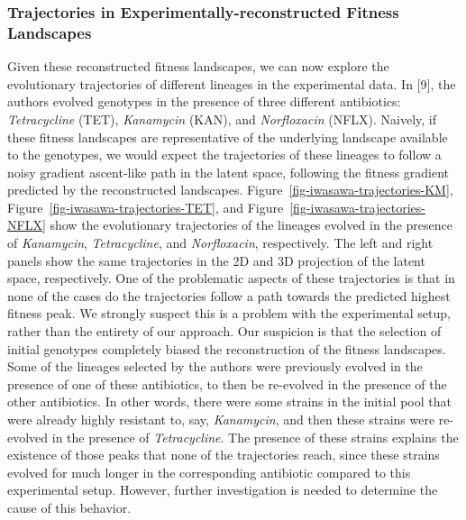 \documentclass[
]{scrartcl}
\begin{document}
\begin{refsection}
\begin{figure}
\end{figure}%

\subsubsection{Trajectories in Experimentally-reconstructed Fitness
Landscapes}\label{trajectories-in-experimentally-reconstructed-fitness-landscapes}

Given these reconstructed fitness landscapes, we can now explore the
evolutionary trajectories of different lineages in the experimental
data. In {[}9{]}, the authors evolved genotypes in the presence of three
different antibiotics: \emph{Tetracycline} (TET), \emph{Kanamycin}
(KAN), and \emph{Norfloxacin} (NFLX). Naively, if these fitness
landscapes are representative of the underlying landscape available to
the genotypes, we would expect the trajectories of these lineages to
follow a noisy gradient ascent-like path in the latent space, following
the fitness gradient predicted by the reconstructed landscapes.
Figure~\ref{fig-iwasawa-trajectories-KM},
Figure~\ref{fig-iwasawa-trajectories-TET}, and
Figure~\ref{fig-iwasawa-trajectories-NFLX} show the evolutionary
trajectories of the lineages evolved in the presence of
\emph{Kanamycin}, \emph{Tetracycline}, and \emph{Norfloxacin},
respectively. The left and right panels show the same trajectories in
the 2D and 3D projection of the latent space, respectively. One of the
problematic aspects of these trajectories is that in none of the cases
do the trajectories follow a path towards the predicted highest fitness
peak. We strongly suspect this is a problem with the experimental setup,
rather than the entirety of our approach. Our suspicion is that the
selection of initial genotypes completely biased the reconstruction of
the fitness landscapes. Some of the lineages selected by the authors
were previously evolved in the presence of one of these antibiotics, to
then be re-evolved in the presence of the other antibiotics. In other
words, there were some strains in the initial pool that were already
highly resistant to, say, \emph{Kanamycin}, and then these strains were
re-evolved in the presence of \emph{Tetracycline}. The presence of these
strains explains the existence of those peaks that none of the
trajectories reach, since these strains evolved for much longer in the
corresponding antibiotic compared to this experimental setup. However,
further investigation is needed to determine the cause of this behavior.

\begin{figure}


\end{figure}
\end{refsection}
\end{document}
